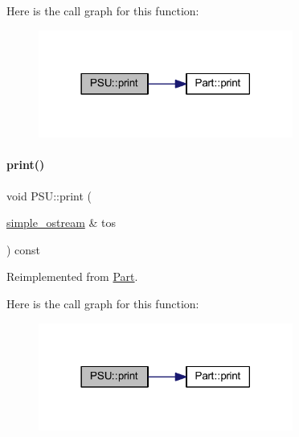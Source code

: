 Here is the call graph for this function\+:
\nopagebreak
\begin{figure}[H]
\begin{center}
\leavevmode
\includegraphics[width=237pt]{class_p_s_u_a81c74aa3a327003c58b89ca2b8602c1d_cgraph}
\end{center}
\end{figure}
\mbox{\label{class_p_s_u_a57f14e0dee163f33d01cdbb159b6d9d6}} 
\paragraph{\texorpdfstring{print()}{print()}\hspace{0.1cm}{\footnotesize\ttfamily [3/4]}}
{\footnotesize\ttfamily void P\+S\+U\+::print (\begin{DoxyParamCaption}\item[{\mbox{\hyperlink{structsimple__ostream}{simple\+\_\+ostream}} \&}]{tos }\end{DoxyParamCaption}) const\hspace{0.3cm}{\ttfamily [virtual]}}



Reimplemented from \mbox{\hyperlink{class_part_aa602d876151b63db72cf8f666847a8cd}{Part}}.

Here is the call graph for this function\+:
\nopagebreak
\begin{figure}[H]
\begin{center}
\leavevmode
\includegraphics[width=237pt]{class_p_s_u_a57f14e0dee163f33d01cdbb159b6d9d6_cgraph}
\end{center}
\end{figure}
\mbox{\label{class_p_s_u_a3690cd51ec36d4a1417c22612793e01c}} 
